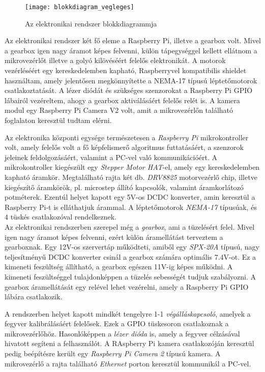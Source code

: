 \begin{figure}[h!]
	\centering
	\texttt{[image: blokkdiagram\_vegleges]}
	\caption{Az elektronikai rendszer blokkdiagrammja}
	\label{fig:system_blokkdiagram}
\end{figure}

Az elektronikai rendszer két fő eleme a Raspberry Pi, illetve a gearbox volt. Mivel a gearbox igen nagy áramot képes felvenni, külön tápegységgel kellett ellátnom a mikrovezérlőt illetve a golyó kilövéséért felelős elektronikát. A motorok vezérléséért egy kereskedelemben kapható, Raspberryvel kompatibilis shieldet használtam, amely jelentősen megkönnyítette a NEMA-17 típusú léptetőmotorok csatlakoztatását. A lézer diódát és szükséges szenzorokat a Raspberry Pi GPIO lábairól vezéreltem, ahogy a gearbox aktiválásáért felelős relét is. A kamera modul egy Raspberry Pi Camera V2 volt, amit a mikrovezérlőn található foglalaton keresztül tudtam elérni. 

Az elektronika központi egysége természetesen a \textsl{Raspberry Pi} mikrokontroller volt, amely felelős volt a fő képfelismerő algoritmus futtatásáért, a szenzorok jeleinek feldolgozásáért, valamint a PC-vel való kommunikációért. A mikrokontroller kiegészült egy \textsl{Stepper Motor HAT}-el, amely egy kereskedelemben kapható áramkör. Megtalálható rajta két db. \textsl{DRV8825} motorvezérlő chip, illetve kiegészítő áramkörök, pl. microstep állító kapcsolók, valamint áramkorlátozó potméterek. Ezentúl helyet kapott egy 5V-os DCDC konverter, amin keresztül a Raspberry Pi-t is elláthatjuk árammal. A léptetőmotorok \textsl{NEMA-17} típusúak, és 4 tüskés csatlakozóval rendelkeznek.\\

Az elektronikai rendszerben szerepel még a \textsl{gearbox}, ami a tüzelésért felel. Mivel igen nagy áramot képes felvenni, ezért külön áramellátást terveztem a gearboxnak. Egy 12V-os szervertáp működteti, amiből egy \textsl{SPX-20A} típusú, nagy teljesítményű DCDC konverter csinál a gearbox számára optimális 7.4V-ot. Ez a kimeneti feszültség állítható, a gearbox egészen 11V-ig képes működni. A kimeneti feszültséggel tulajdonképpen a tüzelés sebességét tudjuk szabályozni. A gearbox áramellátását egy relével lehet vezérelni, amely a Raspberry Pi GPIO lábára csatlakozik.

\pagebreak

A rendszerben helyet kapott mindkét tengelyre 1-1 \textsl{végálláskapcsoló}, amelyek a fegyver kalibrálásáért felelősek. Ezek a GPIO tüskesoron csatlakoznak a mikrovezérlőhöz. Hasonlóképpen a \textsl{lézer dióda} is, amely a fegyver célzásával hivatott segíteni a felhasználót. A RAspberry Pi kamera csatlakozóján keresztül pedig beépítésre került egy \textsl{Raspberry Pi Camera 2} típusú kamera. A mikrovezérlő a rajta található \textsl{Ethernet} porton keresztül kommunikál a PC-vel.

